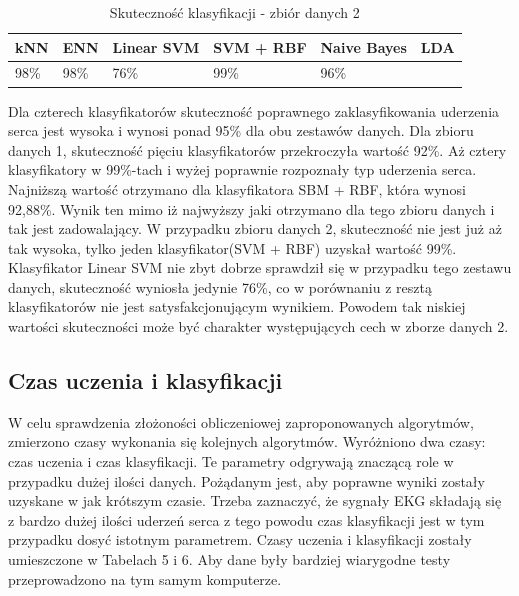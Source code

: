 \documentclass[[10pt,a4paper]{article}
\begin{document}
\begin{table}[h]
\centering
\caption{Skuteczność klasyfikacji - zbiór danych 2}
\label{accuracyTable1}
\begin{tabular}{|l|l|l|l|l|l|}
\hline
kNN & ENN & Linear SVM & SVM + RBF & Naive Bayes & LDA \\ \hline
  98\%   &  98\%  & 76\%       & 99\%      & 96\%        &     \\ \hline
\end{tabular}
\end{table}

Dla czterech klasyfikatorów skuteczność poprawnego zaklasyfikowania uderzenia serca jest wysoka i wynosi ponad 95\% dla obu zestawów danych. Dla zbioru danych 1,  skuteczność pięciu klasyfikatorów przekroczyła wartość 92\%.  Aż cztery klasyfikatory w 99\%-tach i wyżej poprawnie rozpoznały typ uderzenia serca. Najniższą wartość otrzymano dla klasyfikatora SBM + RBF, która wynosi 92,88\%. Wynik ten mimo iż najwyższy jaki otrzymano dla tego zbioru danych i tak jest zadowalający. W przypadku zbioru danych 2, skuteczność nie jest już aż tak wysoka, tylko jeden klasyfikator(SVM + RBF) uzyskał wartość 99\%. Klasyfikator Linear SVM nie zbyt dobrze sprawdził się w przypadku tego zestawu danych, skuteczność wyniosła jedynie 76\%, co w porównaniu z resztą klasyfikatorów nie jest satysfakcjonującym wynikiem. Powodem tak niskiej wartości skuteczności może być charakter występujących cech w zborze danych 2. 





\subsection{Czas uczenia i klasyfikacji}

W celu sprawdzenia złożoności obliczeniowej zaproponowanych algorytmów, zmierzono czasy wykonania się kolejnych algorytmów. Wyróżniono dwa czasy: czas uczenia i czas klasyfikacji. Te parametry odgrywają znaczącą role w przypadku dużej ilości danych. Pożądanym jest, aby poprawne wyniki zostały uzyskane w jak krótszym czasie. Trzeba zaznaczyć, że sygnały EKG składają się z bardzo dużej ilości uderzeń serca z tego  powodu czas klasyfikacji jest w tym przypadku dosyć istotnym parametrem. Czasy uczenia i klasyfikacji zostały umieszczone w Tabelach 5 i 6. Aby dane były bardziej wiarygodne testy przeprowadzono na tym samym komputerze. 
\end{document}
